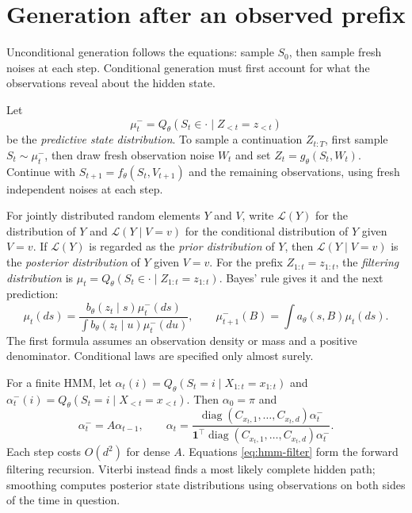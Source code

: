 \documentclass[11pt,twoside]{article}
\DeclareMathOperator{\diag}{diag}
\theoremstyle{definition}
\theoremstyle{remark}
\begin{document}
\section{Generation after an observed prefix}
\label{sec:filtering}

Unconditional generation follows the equations: sample \(S_0\), then
sample fresh noises at each step. Conditional generation must first
account for what the observations reveal about the hidden state.

Let
\[
 \mu_t^-=Q_\theta(S_t\in\cdot\mid Z_{<t}=z_{<t})
\]
be the \emph{predictive state distribution}. To sample a continuation
\(Z_{t:T}\), first sample \(S_t\sim\mu_t^-\), then draw fresh observation
noise \(W_t\) and set \(Z_t=g_\theta(S_t,W_t)\).
Continue with \(S_{t+1}=f_\theta(S_t,V_{t+1})\) and the remaining
observations, using fresh independent noises at each step.

For jointly distributed random elements \(Y\) and \(V\), write
\(\mathcal L(Y)\) for the distribution of \(Y\) and
\(\mathcal L(Y\mid V=v)\) for the conditional distribution of \(Y\) given
\(V=v\). If \(\mathcal L(Y)\) is regarded as the \emph{prior distribution}
of \(Y\), then \(\mathcal L(Y\mid V=v)\) is the \emph{posterior distribution}
of \(Y\) given \(V=v\). For the prefix \(Z_{1:t}=z_{1:t}\), the
\emph{filtering distribution} is
\(\mu_t=Q_\theta(S_t\in\cdot\mid Z_{1:t}=z_{1:t})\).
Bayes' rule gives it and the next prediction:
\begin{equation}
 \mu_t(ds)=\frac{b_\theta(z_t\mid s)\mu_t^-(ds)}
 {\int b_\theta(z_t\mid u)\mu_t^-(du)},\qquad
 \mu_{t+1}^-(B)=\int a_\theta(s,B)\mu_t(ds).
 \label{eq:filter}
\end{equation}
The first formula assumes an observation density or mass and a positive
denominator. Conditional laws are specified only almost surely.

For a finite HMM, let \(\alpha_t(i)=Q_\theta(S_t=i\mid X_{1:t}=x_{1:t})\)
and \(\alpha_t^-(i)=Q_\theta(S_t=i\mid X_{<t}=x_{<t})\).
Then \(\alpha_0=\pi\) and
\begin{equation}
 \alpha_t^-=A\alpha_{t-1},\qquad
 \alpha_t=\frac{\diag(C_{x_t,1},\ldots,C_{x_t,d})\alpha_t^-}
 {\mathbf1^\top\diag(C_{x_t,1},\ldots,C_{x_t,d})\alpha_t^-}.
 \label{eq:hmm-filter}
\end{equation}
Each step costs \(O(d^2)\) for dense \(A\). Equations
\cref{eq:hmm-filter} form the forward filtering recursion. Viterbi instead
finds a most likely complete
hidden path; smoothing computes posterior state distributions using
observations on both sides of the time in question.
\end{document}
